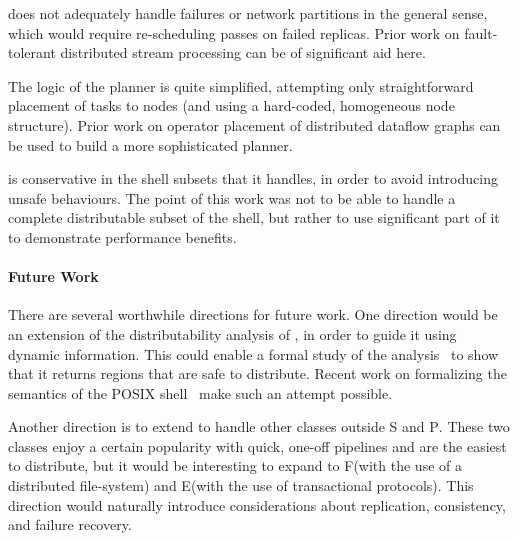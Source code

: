 \documentclass[acmsmall,10pt,review,anonymous]{acmart}
\newcommand{\cn}[1]{\mbox{\textcircled{\footnotesize #1}}}
\newcommand{\pur}{\cn{\textsc{P}}\xspace}
\newcommand{\sta}{\cn{\textsc{S}}\xspace}
\newcommand{\dfs}{\cn{\textsc{F}}\xspace}
\newcommand{\sid}{\cn{\textsc{E}}\xspace}
\begin{document}
\sys does not adequately handle failures or network partitions in the general sense, which would require re-scheduling passes on failed replicas.
Prior work on fault-tolerant distributed stream processing can be of significant aid here.

The logic of the planner is quite simplified, attempting only straightforward placement of tasks to nodes (and using a hard-coded, homogeneous node structure).
Prior work on operator placement of distributed dataflow graphs can be used to build a more sophisticated planner.

\sys is conservative in the shell subsets that it handles, in order to
avoid introducing unsafe behaviours. The point of this work was not to be
able to handle a complete distributable subset of the shell, but
rather to use significant part of it to demonstrate performance benefits.



\paragraph{Future Work}
There are several worthwhile directions for future work.  One
direction would be an extension of the distributability analysis of
\sys, in order to guide it using dynamic information. This could
enable a formal study of the analysis~ to show that it
returns regions that are safe to distribute.  Recent work on
formalizing the semantics of the POSIX shell~\cite{smoosh:20} make
such an attempt possible.

Another direction is to extend \sys to handle other classes outside \sta and \pur.
These two classes enjoy a certain popularity with quick, one-off pipelines and are the easiest to distribute, but 
it would be interesting to expand to \dfs (with the use of a distributed file-system) and \sid (with the use of transactional protocols).
This direction would naturally introduce considerations about replication, consistency, and failure recovery.
\end{document}
